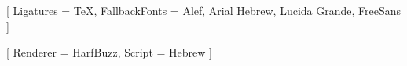 %
%
%


\usepackage{iftex}
\RequireXeTeX




\usepackage{fontspec}
\setmainfont{Source Sans 3}[
  Ligatures    = TeX,
  FallbackFonts = {Alef, Arial Hebrew, Lucida Grande, FreeSans}
]





\newfontfamily{}[
  Renderer = HarfBuzz,
  Script   = Hebrew
]

\usepackage[Hebrew]{ucharclasses}

